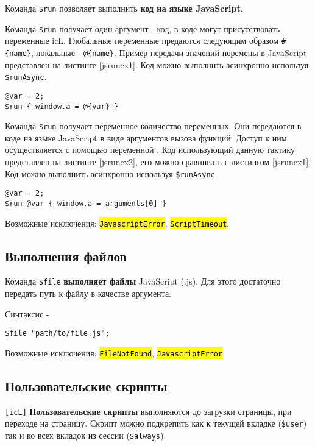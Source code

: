 \documentclass[a4paper, 14pt]{extarticle}
\newcommand{\ferror}[1]{\foreignlanguage{english}{\fontsize{11pt}{12pt}\tt{\sethlcolor{yellow}\hl{#1}}}}
\begin{document}
Команда \lstinline|$run| позволяет выполнить {\bf код на языке JavaScript}.

\code{[icL]} Команда \lstinline|$run| получает один аргумент - код, в коде могут присутствовать переменные icL. Глобальные переменные предаются следующим образом \lstinline|#{name}|, локальные - \lstinline|@{name}|. Пример передачи значений перемены в JavaScript представлен на листинге \ref{jsrunex1}. Код можно выполнить асинхронно используя \lstinline|$runAsync|.

\begin{lstlisting}[caption=Выполнение кода на языке JavaScript (icL), label=jsrunex1]
@var = 2;
$run { window.a = @{var} }
\end{lstlisting}

\code{[w3c]} Команда \lstinline|$run| получает переменное количество переменных. Они передаются в коде на языке JavaScript в виде аргументов вызова функций. Доступ к ним осуществляется с помощью переменной . Код использующий данную тактику представлен на листинге \ref{jsrunex2}, его можно сравнивать с листингом \ref{jsrunex1}. Код можно выполнить асинхронно используя \lstinline|$runAsync|.

\begin{lstlisting}[caption=Выполнение кода на языке JavaScript (w3c), label=jsrunex2]
@var = 2;
$run @var { window.a = arguments[0] }
\end{lstlisting}

Возможные исключения: \ferror{JavascriptError}, \ferror{ScriptTimeout}.

\subsection{Выполнения файлов}

Команда \lstinline|$file| {\bf выполняет файлы} JavaScript (.js). Для этого достаточно передать путь к файлу в качестве аргумента.

Синтаксис -
\begin{lstlisting}[numbers=none]
$file "path/to/file.js";
\end{lstlisting}

Возможные исключения: \ferror{FileNotFound}, \ferror{JavascriptError}.

\subsection{Пользовательские скрипты}

\lstinline|[icL]| {\bf Пользовательские скрипты} выполняются до загрузки страницы, при переходе на страницу. Скрипт можно подкрепить как к текущей вкладке (\lstinline|$user|) так и ко всех вкладок из сессии (\lstinline|$always|).
\end{document}
